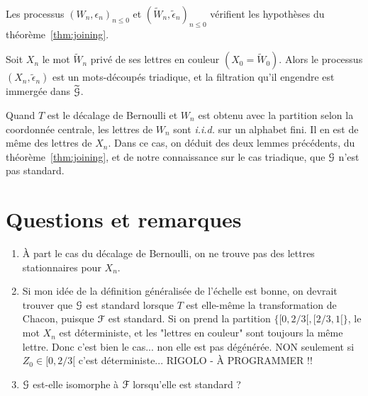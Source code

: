 \documentclass[12pt,a4paper]{article}
\begin{document}
\begin{lemme}
Les processus ${(W_n, \epsilon_n)}_{n \leq 0}$ et 
${(\widetilde{W}_n, \widetilde{\epsilon}_n)}_{n \leq 0}$ 
vérifient les hypothèses du théorème~\ref{thm:joining}. 
\end{lemme}

\begin{lemme}
Soit $X_n$ le mot $\widetilde{W}_n$ privé de ses lettres en couleur $(X_0=\widetilde{W}_0)$. 
Alors le processus $(X_n, \widetilde{\epsilon}_n)$ est un mots-découpés triadique, 
et la filtration qu'il engendre est immergée dans $\widetilde{\EuScript{G}}$.
\end{lemme}

Quand $T$ est le décalage de Bernoulli et $W_n$ est obtenu avec la partition 
selon la coordonnée centrale, les lettres de $W_n$ sont \emph{i.i.d.} sur un alphabet 
fini. Il en est de même des lettres de $X_n$. 
Dans ce cas, on déduit des deux lemmes précédents, du théorème~\ref{thm:joining}, 
et de notre connaissance sur le cas triadique, que $\EuScript{G}$ n'est pas standard. 

\section{Questions et remarques} 

\begin{enumerate}
\item \`A part le cas du décalage de Bernoulli, on ne trouve pas des lettres 
stationnaires pour $X_n$. 

\item Si mon idée de la définition généralisée de l'échelle est bonne, 
on devrait trouver que $\EuScript{G}$ est standard lorsque $T$ est elle-même la transformation de 
Chacon, puisque $\EuScript{F}$ est standard. 
Si on prend la partition $\bigl\{[0,2/3[, [2/3,1[\big\}$, le mot $X_n$ est déterministe,  
et les "lettres en couleur" sont toujours la même lettre. Donc c'est bien le cas... 
non elle est pas dégénérée. 
NON seulement si $Z_0 \in [0,2/3[$ c'est déterministe... RIGOLO - À PROGRAMMER !! 

\item $\EuScript{G}$ est-elle isomorphe à $\EuScript{F}$ lorsqu'elle est standard ? 
\end{enumerate}
\end{document}
